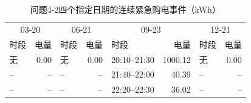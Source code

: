 \begin{table}[H]\centering\scriptsize
\caption{问题4-2四个指定日期的连续紧急购电事件（kWh）}\label{tab:q4_2_emergency}
\begin{tabular}{lrlrlrlr}\toprule
\multicolumn{2}{c}{03-20} & \multicolumn{2}{c}{06-21} & \multicolumn{2}{c}{09-23} & \multicolumn{2}{c}{12-21} \\
时段 & 电量 & 时段 & 电量 & 时段 & 电量 & 时段 & 电量 \\\midrule
无 & 0.00 & 无 & 0.00 & 20:10--21:30 & 1000.12 & 无 & 0.00 \\
-- & -- & -- & -- & 21:40--22:00 & 40.39 & -- & -- \\
-- & -- & -- & -- & 22:20--22:30 & 36.02 & -- & -- \\
\bottomrule\end{tabular}\end{table}
